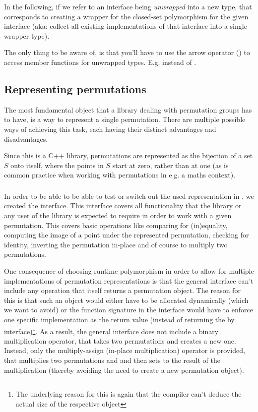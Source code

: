 \documentclass[parskip=half]{scrartcl}
\begin{document}
	In the following, if we refer to an interface being \emph{unwrapped} into a new type, that corresponds to creating a
	 wrapper for the closed-set polymorphism for the given interface (aka: collect all existing
	implementations of that interface into a single wrapper type).

	The only thing to be aware of, is that you'll have to use the arrow operator (\code{->}) to access member functions for unwrapped types. E.g.
	 instead of .


	\subsection{Representing permutations}

	The most fundamental object that a library dealing with permutation groups has to have, is a way to represent a single permutation. There are
	multiple possible ways of achieving this task, each having their distinct advantages and disadvantages. 

	Since this is a C++ library, permutations are represented as the bijection of a set $S$ onto itself, where the points in $S$ start at zero,
	rather than at one (as is common practice when working with permutations in e.g. a maths context).


	\subsubsection{\texorpdfstring{}{AbstractPermutation}}

	In order to be able to be able to test or switch out the used representation in \libPerm, we created the  interface.
	This interface covers all functionality that the library or any user of the library is expected to require in order to work with a given
	permutation. This covers basic operations like comparing for (in)equality, computing the image of a point under the represented permutation,
	checking for identity, inverting the permutation in-place and of course to multiply two permutations.

	One consequence of choosing runtime polymorphism in order to allow for multiple implementations of permutation representations is that the general
	interface can't include any operation that itself returns a permutation object. The reason for this is that such an object would either have to be
	allocated dynamically (which we want to avoid) or the function signature in the interface would have to enforce one specific implementation as the
	return value (instead of returning the by interface)\footnote{The underlying reason for this is again that the compiler can't deduce the actual
	size of the respective object}. As a result, the general interface does not include a binary multiplication operator, that takes two permutations
	and creates a new one. Instead, only the multiply-assign (in-place multiplication) operator is provided, that multiplies two permutations 
	and  and then sets  to the result of the multiplication (thereby avoiding the need to create a new permutation object).
\end{document}
